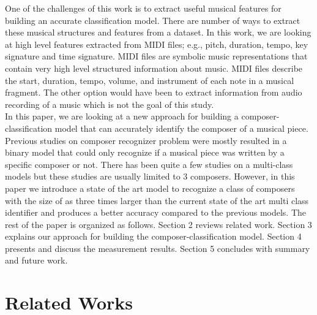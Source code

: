 \documentclass[11pt,a4paper]{article}
\begin{document}
One of the challenges of this work is to extract useful musical features for building an accurate classification model. There are number of ways to extract these musical structures and features from a dataset.  In this work, we are looking at high level features extracted from MIDI files; e.g., pitch, duration, tempo, key signature and time signature. MIDI files are symbolic music representations that contain very high level structured information about music. MIDI files describe the start, duration, tempo, volume, and instrument of each note in a musical fragment. The other option would have been to extract information from audio recording of a music which is not the goal of this study.\\ 

In this paper, we are looking at a new approach for building a composer-classification model that can accurately identify the composer of a musical piece. Previous studies on composer recognizer problem were mostly resulted in a binary model that could only recognize if a musical piece was written by a specific composer or not. There has been quite a few studies on a multi-class models but these studies are usually limited to 3 composers.  However, in this paper we introduce a state of the art model to recognize a class of composers with the size of as three times larger than the current state of the art multi class identifier and produces a better accuracy compared to the previous models. The rest of the paper is organized as follows. Section 2 reviews related work. Section 3 explains our approach for building the composer-classification model. Section 4 presents and discuss the measurement results. Section 5 concludes with summary and future work.


\section{Related Works}
\end{document}
